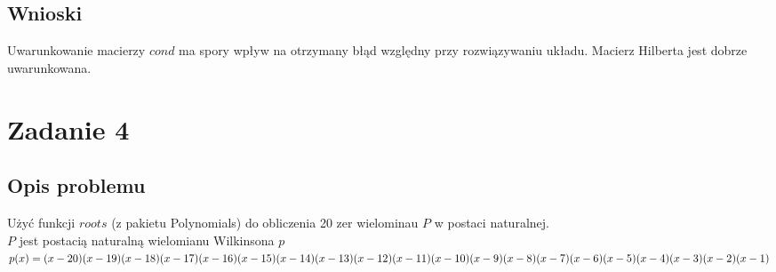 \documentclass{article}
\begin{document}
\subsection*{Wnioski}
	Uwarunkowanie macierzy $cond$ ma spory wpływ na otrzymany błąd względny przy rozwiązywaniu układu.
	Macierz Hilberta jest dobrze uwarunkowana.\\
\section*{Zadanie 4}
\subsection*{Opis problemu}
	Użyć funkcji $roots$ (z pakietu Polynomials) do obliczenia 20 zer wielominau $P$ w postaci naturalnej. \\
	$P$ jest postacią naturalną wielomianu Wilkinsona $p$ \\
	$p(x) = (x - 20)(x - 19)(x - 18)(x - 17)(x - 16)(x - 15) \\
			(x - 14)(x - 13)(x - 12)(x - 11)(x - 10)(x - 9) \\
			(x - 8)(x - 7)(x - 6)(x - 5)(x - 4)(x - 3)(x - 2)(x - 1)$
\end{document}

